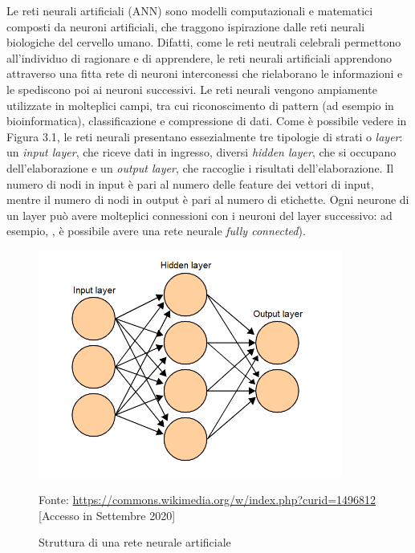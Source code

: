 \documentclass[11pt,  oneside, openany]{book}
\newcommand{\source}[1]{\caption*{Fonte: {#1}} }
\begin{document}
Le reti neurali artificiali (ANN) sono modelli computazionali e matematici composti da neuroni artificiali, che traggono ispirazione dalle reti neurali biologiche del cervello umano. Difatti, come le reti neutrali celebrali permettono all'individuo di ragionare e di apprendere, le reti neurali artificiali apprendono attraverso una fitta rete di neuroni interconessi che rielaborano le informazioni e le spediscono poi ai neuroni successivi. Le reti neurali vengono ampiamente utilizzate in molteplici campi, tra cui riconoscimento di pattern (ad esempio in bioinformatica), classificazione e compressione di dati. Come è possibile vedere in Figura 3.1, le reti neurali presentano essezialmente tre tipologie di strati o \textit{layer}: un \textit{input layer}, che riceve dati in ingresso, diversi \textit{hidden layer}, che si occupano dell'elaborazione e un \textit{output layer}, che raccoglie i risultati dell'elaborazione. Il numero di nodi in input è pari al numero delle feature dei vettori di input, mentre il numero di nodi in output è pari al numero di etichette.  Ogni neurone di un layer può avere molteplici connessioni con i neuroni del layer successivo: ad esempio, , è possibile avere una rete neurale \textit{fully connected}). 

\begin{figure}[h!]
\begin{center}
  \includegraphics[width=10cm]{Immagini/ReteNeurale.png}\\
  \caption{Struttura di una rete neurale artificiale}
  \source{\url{https://commons.wikimedia.org/w/index.php?curid=1496812} [Accesso in Settembre 2020]}
\end{center}
\end{figure}
\end{document}
